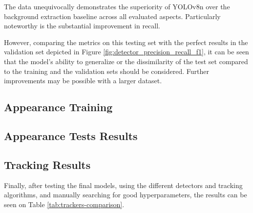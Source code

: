 {
    The data unequivocally demonstrates the superiority of YOLOv8n over the background extraction baseline across all evaluated aspects. 
    Particularly noteworthy is the substantial improvement in recall. 
}

{
    However, comparing the metrics on this testing set with the perfect results in the validation set depicted in Figure \ref{fig:detector_precision_recall_f1}, 
    it can be seen that the model's ability to generalize or the dissimilarity of the test set compared to the training and the validation sets should be considered. 
    Further improvements may be possible with a larger dataset.
}


\needspace{0.25\textheight}
\subsection{Appearance Training}


\FloatBarrier

\needspace{0.25\textheight}
\subsection{Appearance Tests Results} %


\FloatBarrier

\needspace{0.25\textheight}
\subsection{Tracking Results} 

{
    Finally, after testing the final models, using the different detectors and tracking algorithms, and manually searching for good hyperparameters, the results can be seen on Table \ref{tab:trackers-comparison}.
}

